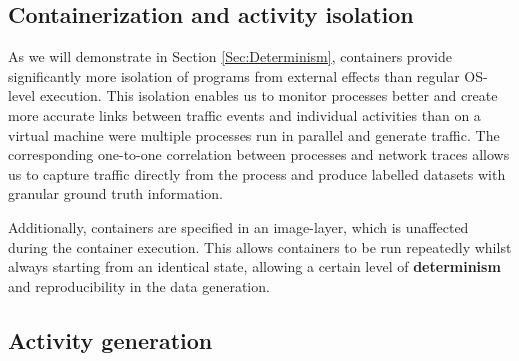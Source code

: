 \subsection{Containerization and activity isolation}

As we will demonstrate in Section \ref{Sec:Determinism}, containers provide significantly more isolation of programs from external effects than regular OS-level execution. This isolation enables us to monitor processes better and create more accurate links between traffic events and individual activities than on a virtual machine were multiple processes run in parallel and generate traffic. The corresponding one-to-one correlation between processes and network traces allows us to capture traffic directly from the process and produce labelled datasets with granular ground truth information.

Additionally, containers are specified in an image-layer, which is unaffected during the container execution. This allows containers to be run repeatedly whilst always starting from an identical state, allowing a certain level of \textbf{determinism} and reproducibility in the data generation.%

 

\subsection{Activity generation}\label{Sec:Scenarios}

